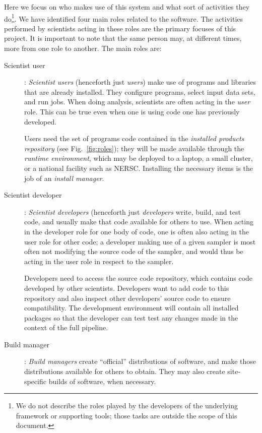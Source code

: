 \documentclass[draftmode,draftwater]{memarticle}
\newcommand{\cosmosis}{\name{CosmoSIS}\xspace}
\begin{document}
Here we focus on who makes use of this system and what sort of
activities they do\footnote{We do not describe the roles played by the
  developers of the underlying framework or supporting tools; those
  tasks are outside the scope of this document.}. We have identified
four main roles related to the \cosmosis software. The activities
performed by scientists acting in these roles are the primary focuses of
this project. It is important to note that the same person may, at
different times, more from one role to another. The main roles are:
\begin{description}

\item[Scientist user]: \emph{Scientist users} (henceforth just
  \emph{users}) make use of programs and libraries that are already
  installed. They configure programs, select input data sets, and run
  jobs. When doing analysis, scientists are often acting in the
  \emph{user} role. This can be true even when one is using code one has
  previously developed.


  Users need the set of programs code contained in the \emph{installed
    products repository} (see Fig.~\ref{fig:roles}); they will be made
  available through the \emph{runtime environment}, which may be
  deployed to a laptop, a small cluster, or a national facility such as
  NERSC. Installing the necessary items is the job of an \emph{install
    manager}.

\item[Scientist developer]: \emph{Scientist developers} (henceforth just
  \emph{developers} write, build, and test code, and usually make that
  code available for others to use. When acting in the developer role
  for one body of code, one is often also acting in the user role for
  other code; \eg a developer making use of a given sampler is most
  often not modifying the source code of the sampler, and would thus be
  acting in the user role in respect to the sampler.

Developers need to access the {source code repository}, which contains code developed by other scientists. Developers want to add code to this repository and also inspect other developers' source code to ensure compatibility. The {development environment} will contain all installed packages so that the developer can test test any changes made in the context of the full pipeline.

\item[Build manager]: \emph{Build managers} create ``official''
  distributions of software, and make those distributions available for
  others to obtain. They may also create site-specific builds of
  software, when necessary. %



\end{description}
\end{document}
